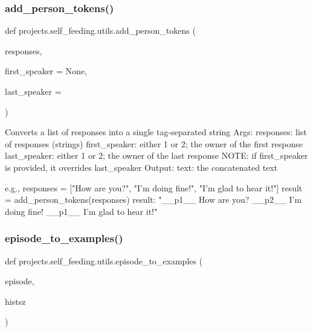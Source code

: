 \subsubsection{\texorpdfstring{add\+\_\+person\+\_\+tokens()}{add\_person\_tokens()}}
{\footnotesize\ttfamily def projects.\+self\+\_\+feeding.\+utils.\+add\+\_\+person\+\_\+tokens (\begin{DoxyParamCaption}\item[{}]{responses,  }\item[{}]{first\+\_\+speaker = {\ttfamily None},  }\item[{}]{last\+\_\+speaker = {} }\end{DoxyParamCaption})}

\begin{DoxyVerb}Converts a list of responses into a single tag-separated string
Args:
    responses: list of responses (strings)
    first_speaker: either 1 or 2; the owner of the first response
    last_speaker: either 1 or 2; the owner of the last response
        NOTE: if first_speaker is provided, it overrides last_speaker
Output:
    text: the concatenated text

e.g.,
responses = ["How are you?", "I'm doing fine!", "I'm glad to hear it!"]
result = add_person_tokens(responses)
result: "__p1__ How are you? __p2__ I'm doing fine! __p1__ I'm glad to
    hear it!"
\end{DoxyVerb}
 \mbox{\label{namespaceprojects_1_1self__feeding_1_1utils_a4523d4a7c4da698dda134e32acebe320}} 
\subsubsection{\texorpdfstring{episode\+\_\+to\+\_\+examples()}{episode\_to\_examples()}}
{\footnotesize\ttfamily def projects.\+self\+\_\+feeding.\+utils.\+episode\+\_\+to\+\_\+examples (\begin{DoxyParamCaption}\item[{}]{episode,  }\item[{}]{histsz }\end{DoxyParamCaption})}

